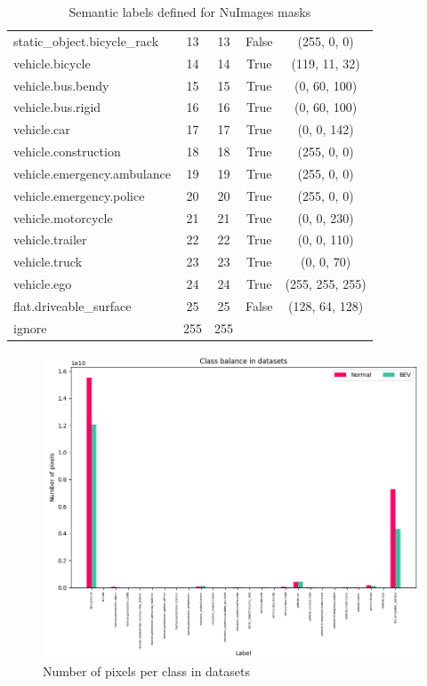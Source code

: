 \begin{table}[h!]
\begin{tabular}{l c c c c}
        static\_object.bicycle\_rack        & 13 & 13 & False & (255, 0, 0) \\
        vehicle.bicycle                     & 14 & 14 & True  & (119, 11, 32) \\
        vehicle.bus.bendy                   & 15 & 15 & True  & (0, 60, 100) \\
        vehicle.bus.rigid                   & 16 & 16 & True  & (0, 60, 100) \\
        vehicle.car                         & 17 & 17 & True  & (0, 0, 142) \\
        vehicle.construction                & 18 & 18 & True  & (255, 0, 0) \\
        vehicle.emergency.ambulance         & 19 & 19 & True  & (255, 0, 0) \\
        vehicle.emergency.police            & 20 & 20 & True  & (255, 0, 0) \\
        vehicle.motorcycle                  & 21 & 21 & True  & (0, 0, 230) \\
        vehicle.trailer                     & 22 & 22 & True  & (0, 0, 110) \\
        vehicle.truck                       & 23 & 23 & True  & (0, 0, 70) \\
        vehicle.ego                         & 24 & 24 & True  & (255, 255, 255) \\
        flat.driveable\_surface             & 25 & 25 & False & (128, 64, 128) \\
        \midrule
        ignore                              & 255 & 255 &       &        \\
        \bottomrule
    \end{tabular}
    \caption{Semantic labels defined for NuImages masks}
    \label{tab:semantic_labels}
\end{table}

\begin{figure}[h!]
    \centering
    \includegraphics[width=\linewidth]{images/appendix/dataset_class_balance_pixels.png}
    \caption{Number of pixels per class in datasets}
    \label{fig:dataset_class_balance_pixels}
\end{figure}

